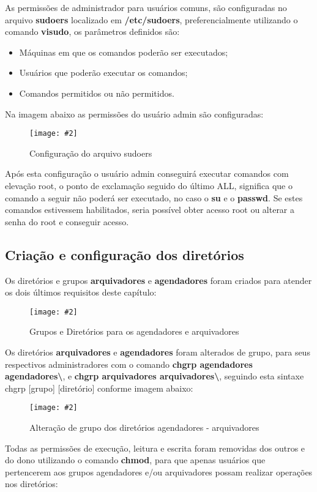 \documentclass[
	12pt,				%
	openany,			%
	a4paper,			%
	chapter=TITLE,		%
	section=TITLE,		%
	english,
	brazil				%
]{abntex2}
\newcommand{\colcheted}{] }
\newcommand{\colchetee}{[}
\newcommand{\includeImage}[3] {

\begin{figure}[H]
 	 \centering
  		\texttt{[image: \#2]}
  	\caption{#3}
\end{figure}

}
\begin{document}
As permissões de administrador para usuários comuns, são configuradas no arquivo \textbf{sudoers} localizado em \textbf{/etc/sudoers}, preferencialmente utilizando o comando \textbf{visudo}, os parâmetros definidos são:

\begin{itemize}
	\item Máquinas em que os comandos poderão ser executados;
	\item Usuários que poderão executar os comandos;
	\item Comandos permitidos ou não permitidos.
\end{itemize}

Na imagem abaixo as permissões do usuário admin são configuradas:

\includeImage{0.7}{imgs/5_gerenciamento_grupos/adicionando_permissoes_de_root_para_usuario_admin.png}{Configuração do arquivo sudoers}

Após esta configuração o usuário admin conseguirá executar comandos com elevação root, o ponto de exclamação seguido do último ALL, significa que o comando a seguir não poderá ser executado, no caso o \textbf{su} e o \textbf{passwd}. Se estes comandos estivessem habilitados, seria possível obter acesso root ou alterar a senha do root e conseguir acesso.

\subsection{Criação e configuração dos diretórios}

Os diretórios e grupos \textbf{arquivadores} e \textbf{agendadores} foram criados para atender os dois últimos requisitos deste capítulo:

\includeImage{0.7}{imgs/5_gerenciamento_grupos/diretorios_grupos_arquivadores_agendadores.png}{Grupos e Diretórios para os agendadores e arquivadores}

Os diretórios \textbf{arquivadores} e \textbf{agendadores} foram alterados de grupo, para seus respectivos administradores com o comando \textbf{chgrp agendadores agendadores\textbackslash}, e \textbf{chgrp arquivadores arquivadores\textbackslash}, seguindo esta sintaxe chgrp \colchetee grupo\colcheted \colchetee diretório\colcheted conforme imagem abaixo:

\includeImage{0.7}{imgs/5_gerenciamento_grupos/alteracao_de_grupo_dos_diretorios.png}{Alteração de grupo dos diretórios agendadores - arquivadores}

Todas as permissões de execução, leitura e escrita foram removidas dos outros e do dono utilizando o comando \textbf{chmod}, para que apenas usuários que pertencerem aos grupos agendadores e/ou arquivadores possam realizar operações nos diretórios:
\end{document}
